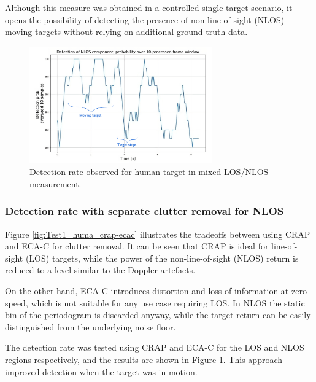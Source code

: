 Although this measure was obtained in a controlled single-target scenario, it opens the possibility of detecting the presence of non-line-of-sight (NLOS) moving targets without relying on additional ground truth data.


\begin{figure}[H]
	\centering
	\includegraphics[width=0.7\textwidth]{Images/Test1/moving_avg-transformed_wtext}
	\caption{Detection rate observed for human target in mixed LOS/NLOS measurement.}
	\label{fig:Test1_moving_avg}
\end{figure}


\subsubsection{Detection rate with separate clutter removal for NLOS}

Figure \ref{fig:Test1_huma_crap-ecac} illustrates the tradeoffs between using CRAP and ECA-C for clutter removal. It can be seen that CRAP is ideal for line-of-sight (LOS) targets, while the power of the non-line-of-sight (NLOS) return is reduced to a level similar to the Doppler artefacts.

On the other hand, ECA-C introduces distortion and loss of information at zero speed, which is not suitable for any use case requiring LOS. In NLOS the static bin of the periodogram is discarded anyway, while the target return can be easily distinguished from the underlying noise floor.

The detection rate was tested using CRAP and ECA-C for the LOS and NLOS regions respectively, and the results are shown in Figure \ref{fig:Test1_moving_avg}.
This approach improved detection when the target was in motion.

